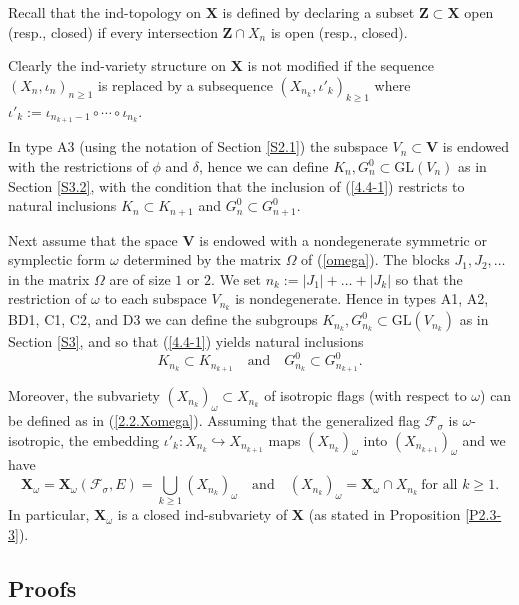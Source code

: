\documentclass{amsart}
\theoremstyle{definition}
\begin{document}
Recall that the ind-topology on $\mathbf{X}$ is defined by declaring a subset $\mathbf{Z}\subset\mathbf{X}$ open (resp., closed) if every intersection $\mathbf{Z}\cap X_n$ is open (resp., closed).

Clearly the ind-variety structure on $\mathbf{X}$ is not modified if the sequence $(X_n,\iota_n)_{n\geq 1}$ is replaced by a subsequence $(X_{n_k},\iota'_k)_{k\geq 1}$
where $\iota'_k:=\iota_{n_{k+1}-1}\circ\cdots\circ\iota_{n_k}$.

In type A3 (using the notation of Section \ref{S2.1}) the subspace $V_n\subset\mathbf{V}$ is endowed with the restrictions of $\phi$ and $\delta$,
hence we can define $K_n,G_n^0\subset \mathrm{GL}(V_n)$ as in Section \ref{S3.2}, with the condition that the inclusion of (\ref{4.4-1}) restricts to natural inclusions
$K_n\subset K_{n+1}$ and $G_n^0\subset G_{n+1}^0$.

Next assume that the space $\mathbf{V}$ is endowed with a nondegenerate symmetric or symplectic form $\omega$ determined by the matrix $\Omega$ of (\ref{omega}).
The blocks $J_1,J_2,\ldots$ in the matrix $\Omega$ are of size $1$ or $2$.
We set $n_k:=|J_1|+\ldots+|J_k|$
so that the restriction of $\omega$ to each subspace $V_{n_k}$ is nondegenerate.
Hence in types A1, A2, BD1, C1, C2, and D3 we can define
the subgroups $K_{n_k},G_{n_k}^0\subset \mathrm{GL}(V_{n_k})$
as in Section \ref{S3},
and so that (\ref{4.4-1}) yields natural inclusions
\[K_{n_k}\subset K_{n_{k+1}}\quad\mbox{and}\quad G^0_{n_k}\subset G^0_{n_{k+1}}.\]

Moreover, the subvariety $(X_{n_k})_\omega\subset X_{n_k}$ of isotropic flags (with respect to $\omega$) can be defined as in (\ref{2.2.Xomega}).
Assuming that the generalized flag $\mathcal{F}_\sigma$ is $\omega$-isotropic, the embedding 
$\iota'_k:X_{n_k}\hookrightarrow X_{n_{k+1}}$ maps $(X_{n_k})_\omega$ into $(X_{n_{k+1}})_\omega$ and we have
\[\mathbf{X}_\omega=\mathbf{X}_\omega(\mathcal{F}_\sigma,E)=\bigcup_{k\geq 1}(X_{n_k})_\omega\quad\mbox{and}\quad (X_{n_k})_\omega=\mathbf{X}_\omega\cap X_{n_k}\ \mbox{for all $k\geq 1$}.\]
In particular, $\mathbf{X}_\omega$ is a closed ind-subvariety of $\mathbf{X}$
(as stated in Proposition \ref{P2.3-3}).

\subsection{Proofs}

\label{S4.proofs}
\end{document}
